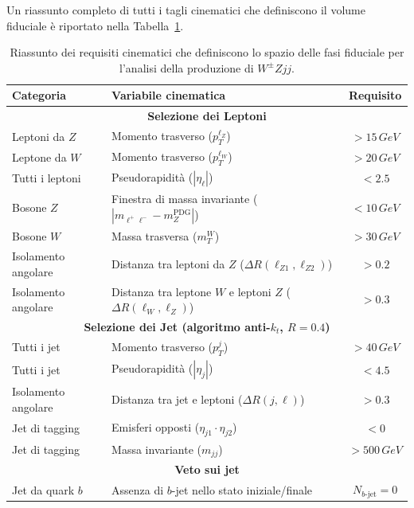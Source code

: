 \documentclass[11pt]{article}
\begin{document}
Un riassunto completo di tutti i tagli cinematici che definiscono il volume fiduciale è riportato nella Tabella~\ref{tab:fiducial_phase_space}.
\begin{table}[htbp]
\centering
\renewcommand{\arraystretch}{1.4} %
\begin{tabular}{llc}
\hline
\textbf{Categoria} & \textbf{Variabile cinematica} & \textbf{Requisito} \\
\hline
\multicolumn{3}{c}{\textbf{Selezione dei Leptoni}} \\
\hline
Leptoni da $Z$ & Momento trasverso ($p_T^{\ell_Z}$) & $> 15\,\unit{GeV}$ \\
Leptone da $W$ & Momento trasverso ($p_T^{\ell_W}$) & $> 20\,\unit{GeV}$ \\
Tutti i leptoni & Pseudorapidità ($|\eta_\ell|$) & $< 2.5$ \\
Bosone $Z$ & Finestra di massa invariante ($|m_{\ell^+ \ell^-} - m_Z^{\textrm{PDG}}|$) & $< 10\,\unit{GeV}$ \\
Bosone $W$ & Massa trasversa ($m_T^W$) & $> 30\,\unit{GeV}$ \\
Isolamento angolare & Distanza tra leptoni da $Z$ ($\Delta R(\ell_{Z1}, \ell_{Z2})$) & $> 0.2$ \\
Isolamento angolare & Distanza tra leptone $W$ e leptoni $Z$ ($\Delta R(\ell_W, \ell_Z)$) & $> 0.3$ \\
\hline
\multicolumn{3}{c}{\textbf{Selezione dei Jet (algoritmo anti-$k_t$, $R=0.4$)}} \\
\hline
Tutti i jet & Momento trasverso ($p_T^j$) & $> 40\,\unit{GeV}$ \\
Tutti i jet & Pseudorapidità ($|\eta_j|$) & $< 4.5$ \\
Isolamento angolare & Distanza tra jet e leptoni ($\Delta R(j, \ell)$) & $> 0.3$ \\
Jet di tagging & Emisferi opposti ($\eta_{j1} \cdot \eta_{j2}$) & $< 0$ \\
Jet di tagging & Massa invariante ($m_{jj}$) & $> 500\,\unit{GeV}$ \\
\hline
\multicolumn{3}{c}{\textbf{Veto sui jet}} \\
\hline
Jet da quark $b$ & Assenza di $b$-jet nello stato iniziale/finale & $N_{b\text{-jet}} = 0$ \\
\hline
\end{tabular}
\caption{Riassunto dei requisiti cinematici che definiscono lo spazio delle fasi fiduciale per l'analisi della produzione di $W^\pm Zjj$.}
\label{tab:fiducial_phase_space}
\end{table}
\end{document}
